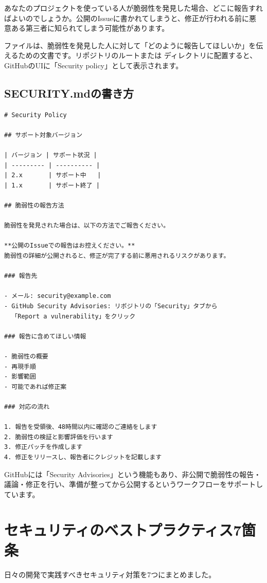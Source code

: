 あなたのプロジェクトを使っている人が脆弱性を発見した場合、どこに報告すればよいのでしょうか。公開のIssueに書かれてしまうと、修正が行われる前に悪意ある第三者に知られてしまう可能性があります。

 ファイルは、脆弱性を発見した人に対して「どのように報告してほしいか」を伝えるための文書です。リポジトリのルートまたは  ディレクトリに配置すると、GitHubのUIに「Security policy」として表示されます。

\subsection{SECURITY.mdの書き方}

\begin{lstlisting}[language={}]
# Security Policy

## サポート対象バージョン

| バージョン | サポート状況 |
| --------- | ---------- |
| 2.x       | サポート中   |
| 1.x       | サポート終了 |

## 脆弱性の報告方法

脆弱性を発見された場合は、以下の方法でご報告ください。

**公開のIssueでの報告はお控えください。**
脆弱性の詳細が公開されると、修正が完了する前に悪用されるリスクがあります。

### 報告先

- メール: security@example.com
- GitHub Security Advisories: リポジトリの「Security」タブから
  「Report a vulnerability」をクリック

### 報告に含めてほしい情報

- 脆弱性の概要
- 再現手順
- 影響範囲
- 可能であれば修正案

### 対応の流れ

1. 報告を受領後、48時間以内に確認のご連絡をします
2. 脆弱性の検証と影響評価を行います
3. 修正パッチを作成します
4. 修正をリリースし、報告者にクレジットを記載します
\end{lstlisting}

GitHubには「Security Advisories」という機能もあり、非公開で脆弱性の報告・議論・修正を行い、準備が整ってから公開するというワークフローをサポートしています。

\section{セキュリティのベストプラクティス7箇条}

日々の開発で実践すべきセキュリティ対策を7つにまとめました。

